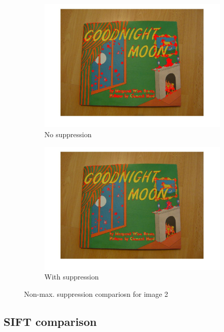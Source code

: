 \documentclass[paper=a4, fontsize=11pt]{scrartcl} %
\numberwithin{equation}{section} %
\numberwithin{figure}{section} %
\numberwithin{table}{section} %
\begin{document}
\begin{figure}
\centering
\begin{subfigure}{.5\textwidth}
  \centering
  \includegraphics[width=1\linewidth]{img2_harris_no_supr.jpg}
  \caption{No suppression}
\end{subfigure}%
\begin{subfigure}{.5\textwidth}
  \centering
  \includegraphics[width=1\linewidth]{im2_harris_corners.jpg}
  \caption{With suppression}
\end{subfigure}
\caption{Non-max. suppression compariosn for image 2}
\label{fig:supr2}
\end{figure}


\subsection{SIFT comparison}
\end{document}
